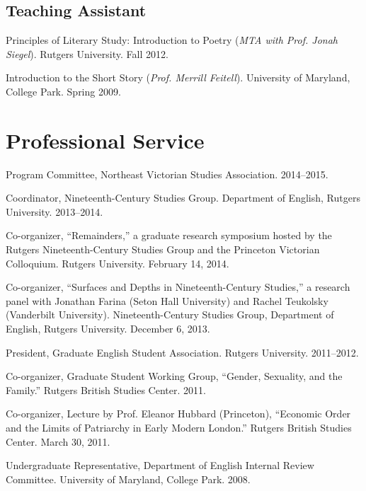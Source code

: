 \documentclass[10pt,letterpaper]{article}
\renewenvironment{itemize}{
  \begin{list}{}{
    \setlength{\leftmargin}{1.5em}
    \setlength{\itemsep}{0.25em}
    \setlength{\parskip}{0pt}
    \setlength{\parsep}{0.25em}
  }
}{
  \end{list}
}
\begin{document}
\subsection*{Teaching Assistant}
\begin{itemize}
\item Principles of Literary Study: Introduction to Poetry (\emph{MTA with Prof. Jonah Siegel}). Rutgers University. Fall 2012.
\item Introduction to the Short Story (\emph{Prof. Merrill Feitell}). University of Maryland, College Park. Spring 2009.
\end{itemize}


\section*{Professional Service}

\begin{itemize}
\item Program Committee, Northeast Victorian Studies Association. 2014--2015.
\item Coordinator, Nineteenth-Century Studies Group. Department of English, Rutgers University. 2013--2014.
\item Co-organizer, ``Remainders,'' a graduate research symposium hosted by the Rutgers Nineteenth-Century Studies Group and the Princeton Victorian Colloquium. Rutgers University. February 14, 2014.
\item Co-organizer, ``Surfaces and Depths in Nineteenth-Century Studies,'' a research panel with Jonathan Farina (Seton Hall University) and Rachel Teukolsky (Vanderbilt University). Nineteenth-Century Studies Group, Department of English, Rutgers University. December 6, 2013.
\item President, Graduate English Student Association. Rutgers University. 2011--2012.
\item Co-organizer, Graduate Student Working Group, ``Gender, Sexuality, and the Family.'' Rutgers British Studies Center. 2011.
\item Co-organizer, Lecture by Prof. Eleanor Hubbard (Princeton), ``Economic Order and the Limits of Patriarchy in Early Modern London.'' Rutgers British Studies Center. March 30, 2011.
\item Undergraduate Representative, Department of English Internal Review Committee. University of Maryland, College Park. 2008.
\end{itemize}
\end{document}
